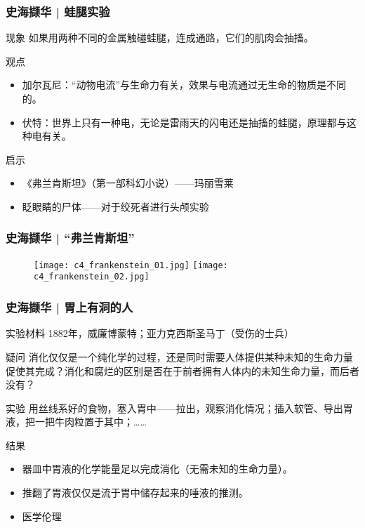\begin{frame}
  \frametitle{史海撷华 | 蛙腿实验}
  \begin{block}{现象}
    如果用两种不同的金属触碰蛙腿，连成通路，它们的肌肉会抽搐。
  \end{block}
  \pause
  \begin{block}{观点}
    \begin{itemize}
      \item 加尔瓦尼：“动物电流”与生命力有关，效果与电流通过无生命的物质是不同的。
      \item 伏特：世界上只有一种电，无论是雷雨天的闪电还是抽搐的蛙腿，原理都与这种电有关。
    \end{itemize}
  \end{block}
  \pause
  \begin{block}{启示}
    \begin{itemize}
      \item 《弗兰肯斯坦》（第一部科幻小说）——玛丽\textbullet 雪莱
      \item 眨眼睛的尸体——对于绞死者进行头颅实验
    \end{itemize}
  \end{block}
\end{frame}

\begin{frame}
  \frametitle{史海撷华 | “弗兰肯斯坦”}
  \begin{figure}
    \centering
    \texttt{[image: c4\_frankenstein\_01.jpg]}\quad
    \texttt{[image: c4\_frankenstein\_02.jpg]}
  \end{figure}
\end{frame}

\begin{frame}
  \frametitle{史海撷华 | 胃上有洞的人}
  \begin{block}{实验材料}
       1882年，威廉\textbullet 博蒙特；亚力克西斯\textbullet 圣马丁（受伤的士兵）
  \end{block}
  \vspace{-0.5em}
  \pause
  \begin{block}{疑问}
消化仅仅是一个纯化学的过程，还是同时需要人体提供某种未知的生命力量促使其完成？消化和腐烂的区别是否在于前者拥有人体内的未知生命力量，而后者没有？
  \end{block}
  \vspace{-0.5em}
  \pause
  \begin{block}{实验}
      用丝线系好的食物，塞入胃中——拉出，观察消化情况；插入软管、导出胃液，把一把牛肉粒置于其中；……
  \end{block}
  \vspace{-0.5em}
  \pause
  \begin{block}{结果}
    \begin{itemize}
      \item 器皿中胃液的化学能量足以完成消化（无需未知的生命力量）。
      \item 推翻了胃液仅仅是流于胃中储存起来的唾液的推测。
      \item 医学伦理
    \end{itemize}
  \end{block}
\end{frame}

